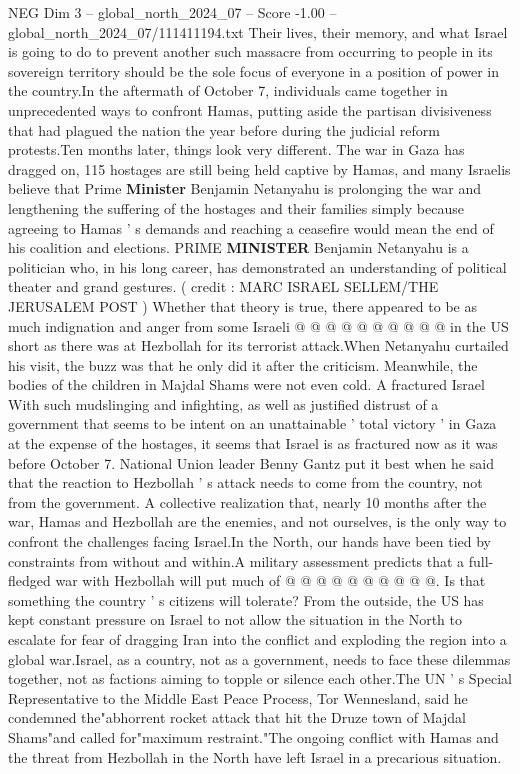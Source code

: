 \begin{textsample}{NEG Dim 3 – global\_north\_2024\_07 – Score -1.00 – global\_north\_2024\_07/111411194.txt}  \label{ex:f3_neg_373}
Their lives, their memory, and what Israel is going to do to prevent another such massacre from occurring to people in its sovereign territory should be the sole focus of everyone in a position of power in the country.In the aftermath of October 7, individuals came together in unprecedented ways to confront Hamas, putting aside the partisan divisiveness that had plagued the nation the year before during the judicial reform protests.Ten months later, things look very different.
The war in Gaza has dragged on, 115 hostages are still being held captive by Hamas, and many Israelis believe that Prime \textbf{Minister} Benjamin Netanyahu is prolonging the war and lengthening the suffering of the hostages and their families simply because agreeing to Hamas ' s demands and reaching a ceasefire would mean the end of his coalition and elections.
PRIME \textbf{MINISTER} Benjamin Netanyahu is a politician who, in his long career, has demonstrated an understanding of political theater and grand gestures. ( credit : MARC ISRAEL SELLEM/THE JERUSALEM POST ) Whether that theory is true, there appeared to be as much indignation and anger from some Israeli @ @ @ @ @ @ @ @ @ @ in the US short as there was at Hezbollah for its terrorist attack.When Netanyahu curtailed his visit, the buzz was that he only did it after the criticism.
Meanwhile, the bodies of the children in Majdal Shams were not even cold.
A fractured Israel With such mudslinging and infighting, as well as justified distrust of a government that seems to be intent on an unattainable ' total victory ' in Gaza at the expense of the hostages, it seems that Israel is as fractured now as it was before October 7.
National Union leader Benny Gantz put it best when he said that the reaction to Hezbollah ' s attack needs to come from the country, not from the government.
A collective realization that, nearly 10 months after the war, Hamas and Hezbollah are the enemies, and not ourselves, is the only way to confront the challenges facing Israel.In the North, our hands have been tied by constraints from without and within.A military assessment predicts that a full-fledged war with Hezbollah will put much of @ @ @ @ @ @ @ @ @ @.
Is that something the country ' s citizens will tolerate?
From the outside, the US has kept constant pressure on Israel to not allow the situation in the North to escalate for fear of dragging Iran into the conflict and exploding the region into a global war.Israel, as a country, not as a government, needs to face these dilemmas together, not as factions aiming to topple or silence each other.The UN ' s Special Representative to the Middle East Peace Process, Tor Wennesland, said he condemned the"abhorrent rocket attack that hit the Druze town of Majdal Shams"and called for"maximum restraint."The ongoing conflict with Hamas and the threat from Hezbollah in the North have left Israel in a precarious situation.

\end{textsample}
